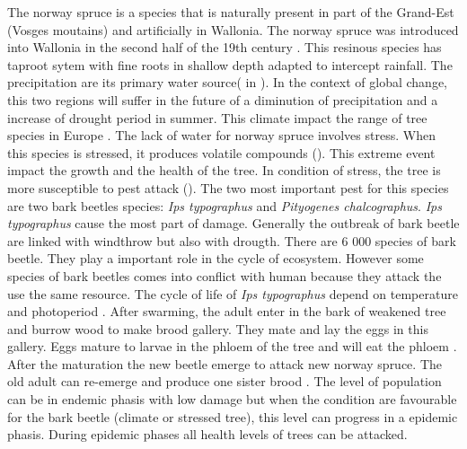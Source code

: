 \documentclass[3p,procedia]{elsarticle}
\begin{document}
The norway spruce is a species that is naturally present in part of the Grand-Est (Vosges moutains)  and artificially  in Wallonia. 
The norway spruce was introduced into Wallonia in the second half of the 19th century \citep{Noirfalise_1975}.
This resinous species has taproot sytem with fine roots in shallow depth adapted to intercept rainfall. 
The precipitation are its primary water source(\cite{weihe_1984} in \cite{tjoeker_biology_nodate}).
In the context of global change, this two regions will suffer in the future of a diminution of precipitation and a increase of drought period in summer. 
This climate impact the range of tree species in Europe  \citep{hanewinkel2013climate}.
The lack of water for norway spruce involves stress. When this species is stressed, it produces volatile compounds (\cite{netherer_interactions_2021}). %
This extreme event impact the growth and the health of the tree.
In condition of stress, the tree is more susceptible to pest attack (\cite{netherer_waterlimiting_2015}).
The two most important pest for this species are two  bark beetles species: \textit{Ips typographus} and \textit{Pityogenes chalcographus}. 
\textit{Ips typographus} cause the most part of damage. Generally the outbreak of bark beetle are linked with windthrow but also with drougth. 
There are 6 000 species of bark beetle. 
They play a important role in the cycle of ecosystem. 
However some species of bark beetles comes into conflict with human because they attack the use the same resource\citep{raffa_natural_2015}.%
The cycle of life of \textit{Ips typographus} depend on temperature and photoperiod \citep{baier_phenipscomprehensive_2007,annila_influence_1969}.
After swarming, the adult enter in the bark of weakened tree and burrow wood to make brood gallery.
They mate and lay the eggs in this gallery. 
Eggs mature to larvae in the phloem of the tree and will eat the phloem \citep{hlasny_bark_2021}.
After the maturation the new beetle emerge to attack new norway spruce.
The old adult can re-emerge and produce one sister brood \citep{zolubas_1995}.
The level of population can be in endemic phasis with low damage but when the condition are favourable for the bark beetle (climate or stressed tree), this level  
can progress in a epidemic phasis\citep{kautz_individual_2014}.
During epidemic phases all health levels of trees can be attacked.
 
\end{document}
